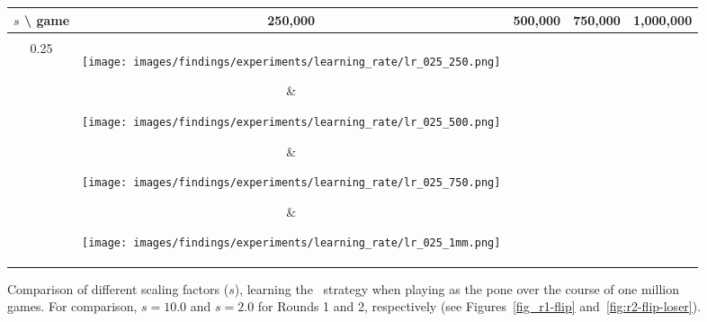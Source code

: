 \begin{figure}[h]
	\centering

	\begin{tabular}{c | c c c c}
		$s$ \textbf{\textbackslash} game & 250,000 & 500,000 & 750,000 & 1,000,000 \\
		\hline
		\\
		0.25 & %
			\parbox[c]{5em}{\texttt{[image: images/findings/experiments/learning\_rate/lr\_025\_250.png]}} & %
			\parbox[c]{5em}{\texttt{[image: images/findings/experiments/learning\_rate/lr\_025\_500.png]}} & %
			\parbox[c]{5em}{\texttt{[image: images/findings/experiments/learning\_rate/lr\_025\_750.png]}} & %
			\parbox[c]{5em}{\texttt{[image: images/findings/experiments/learning\_rate/lr\_025\_1mm.png]}} \\ %
		\\
		0.50 & 
			\parbox[c]{5em}{\texttt{[image: images/findings/experiments/learning\_rate/lr\_050\_250.png]}} & %
			\parbox[c]{5em}{\texttt{[image: images/findings/experiments/learning\_rate/lr\_050\_500.png]}} & %
			\parbox[c]{5em}{\texttt{[image: images/findings/experiments/learning\_rate/lr\_050\_750.png]}} & %
			\parbox[c]{5em}{\texttt{[image: images/findings/experiments/learning\_rate/lr\_050\_1mm.png]}} \\ %
		\\
		0.75 & 
			\parbox[c]{5em}{\texttt{[image: images/findings/experiments/learning\_rate/lr\_075\_250.png]}} & %
			\parbox[c]{5em}{\texttt{[image: images/findings/experiments/learning\_rate/lr\_075\_500.png]}} & %
			\parbox[c]{5em}{\texttt{[image: images/findings/experiments/learning\_rate/lr\_075\_750.png]}} & %
			\parbox[c]{5em}{\texttt{[image: images/findings/experiments/learning\_rate/lr\_075\_1mm.png]}} \\ %
		\\
		1.50 & 
			\parbox[c]{5em}{\texttt{[image: images/findings/experiments/learning\_rate/lr\_150\_250.png]}} & %
			\parbox[c]{5em}{\texttt{[image: images/findings/experiments/learning\_rate/lr\_150\_500.png]}} & %
			\parbox[c]{5em}{\texttt{[image: images/findings/experiments/learning\_rate/lr\_150\_750.png]}} & %
			\parbox[c]{5em}{\texttt{[image: images/findings/experiments/learning\_rate/lr\_150\_1mm.png]}} \\ %
	\end{tabular}

\caption{
	Comparison of different scaling factors ($s$),
	learning the \handmaxavg\ strategy
	when playing as the pone
	over the course of one million games.
	For comparison, $s = 10.0$ and $s = 2.0$ for Rounds 1 and 2, respectively
	(see Figures~\ref{fig_r1-flip} and~\ref{fig:r2-flip-loser}).
	}
\label{fig:expts-lr-comp}
\end{figure}
